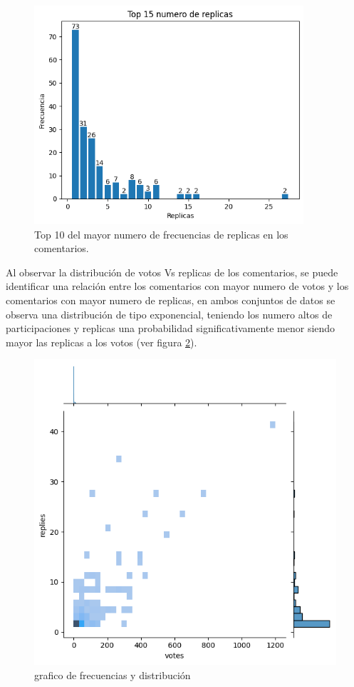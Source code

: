 \begin{figure}[!h]
	\centering
	\includegraphics[width=10cm]{../Datos/Top10Replicas}
	\caption{Top 10 del mayor numero de frecuencias de replicas en los comentarios.}
	\label{fig:top10R}
\end{figure}


Al observar la distribución de votos Vs replicas de los comentarios, se puede identificar una relación entre los comentarios con mayor numero de votos y los comentarios con mayor numero de replicas, en ambos conjuntos de datos se observa una distribución de tipo exponencial, teniendo los numero altos de participaciones y replicas una probabilidad significativamente menor siendo mayor las replicas a los votos (ver figura \ref{fig:FyD}).\\


\begin{figure}[!h]
	\centering
	\includegraphics[width=13cm]{../Datos/AcumulacionYdistribuciones}
	\caption{grafico de frecuencias y distribución}
	\label{fig:FyD}
\end{figure}

